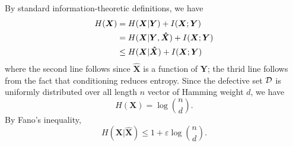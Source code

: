\documentclass[onecolumn,letterpaper]{IEEEtran}
\newcommand{\cD}{{\cal D}}
\newcommand{\cx}{{X}}
\newcommand{\cy}{{Y}}
\newcommand{\cxh}{{\hat{X}}}
\newcommand{\etp}{{H}}
\newcommand{\mi}{{I}}
\newcommand{\cA}{{Z}}
\begin{document}
 By standard information-theoretic definitions, we have
\begin{align} \label{eq:cv:etp}
    \etp(\boldsymbol{\cx}) &= \etp(\boldsymbol{\cx}|\boldsymbol{\cy}) + \mi(\boldsymbol{\cx};\boldsymbol{\cy})\notag\\
                           &=\etp(\boldsymbol{\cx}|\boldsymbol{\cy},\boldsymbol{\cxh}) + \mi(\boldsymbol{\cx};\boldsymbol{\cy})\notag\\
                           &\leq \etp(\boldsymbol{\cx}|\boldsymbol{\cxh}) + \mi(\boldsymbol{\cx};\boldsymbol{\cy})
\end{align}
where the second line follows since $\boldsymbol{\cxh}$ is a function of $\boldsymbol{\cy}$; the thrid line follows from the fact that conditioning reduces entropy.
Since the defective set $\cD$ is uniformly distributed over all length $n$ vector of Hamming weight $d$, we have
\begin{equation} \label{eq:cv:H(x)}
    \etp(\boldsymbol{\cx}) = \log \binom{n}{d}.
\end{equation}
By Fano's inequality,
\begin{equation} \label{eq:cv:H(x|xh)}
    \etp(\boldsymbol{\cx} | \boldsymbol{\cxh}) \le 1 + \varepsilon \log\binom{n}{d}.
\end{equation}
\end{document}
